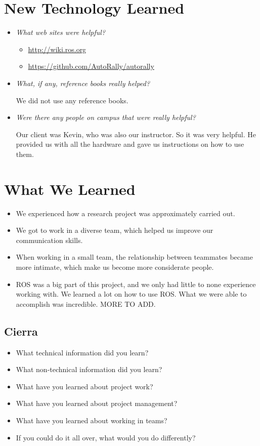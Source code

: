 \documentclass[compsoc,draftclsnofoot,onecolumn,10pt]{IEEEtran}
\begin{document}
\section{New Technology Learned}
\begin{itemize}
    \item \textit{What web sites were helpful?}
      \begin{itemize}
        \item \url{http://wiki.ros.org}
        \item \url{https://github.com/AutoRally/autorally}
      \end{itemize}
    \item \textit{What, if any, reference books really helped?}\par
      We did not use any reference books.
    \item \textit{Were there any people on campus that were really helpful?}\par
      Our client was Kevin, who was also our instructor. So it was very helpful.
      He provided us with all the hardware and gave us instructions on how to use them.
\end{itemize}

\section{What We Learned}
  \begin{itemize}
    \item We experienced how a research project was approximately carried out.
    \item We got to work in a diverse team, which helped us improve our
    communication skills.
    \item When working in a small team, the relationship between teammates became
    more intimate, which make us become more considerate people.
    \item ROS was a big part of this project, and we only had little to none
    experience working with. We learned a lot on how to use ROS. What we were able
    to accomplish was incredible.
    \itme MORE TO ADD.
  \end{itemize}

\subsection{Cierra}
\begin{itemize}
    \item What technical information did you learn?
    \item What non-technical information did you learn?
    \item What have you learned about project work?
    \item What have you learned about project management?
    \item What have you learned about working in teams?
    \item If you could do it all over, what would you do differently?
\end{itemize}
\end{document}
